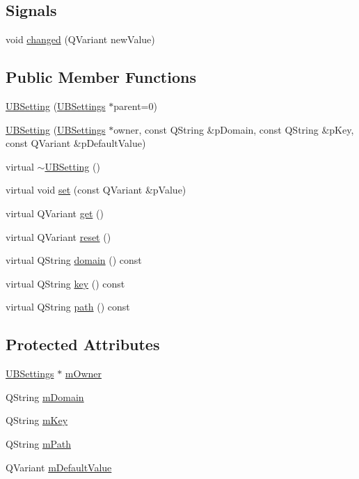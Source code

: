 \subsection*{Signals}
\begin{DoxyCompactItemize}
\item 
void \hyperlink{class_u_b_setting_a0f7d1e100a9d7d35a58c818a356702c7}{changed} (Q\-Variant new\-Value)
\end{DoxyCompactItemize}
\subsection*{Public Member Functions}
\begin{DoxyCompactItemize}
\item 
\hyperlink{class_u_b_setting_a4d219c5915a26e3575fc30c48d0f7bd1}{U\-B\-Setting} (\hyperlink{class_u_b_settings}{U\-B\-Settings} $\ast$parent=0)
\item 
\hyperlink{class_u_b_setting_a2c9ee4f1decfd6d14d4d3839ad9d58b3}{U\-B\-Setting} (\hyperlink{class_u_b_settings}{U\-B\-Settings} $\ast$owner, const Q\-String \&p\-Domain, const Q\-String \&p\-Key, const Q\-Variant \&p\-Default\-Value)
\item 
virtual \hyperlink{class_u_b_setting_af42b0a45a5dbe3b1bbf82a8176094fba}{$\sim$\-U\-B\-Setting} ()
\item 
virtual void \hyperlink{class_u_b_setting_a5dc12b91ffabb031a3a7a8322f5d30ed}{set} (const Q\-Variant \&p\-Value)
\item 
virtual Q\-Variant \hyperlink{class_u_b_setting_afe671b284dd9f1e313e6f27df3ecd2a8}{get} ()
\item 
virtual Q\-Variant \hyperlink{class_u_b_setting_a63ccc6724ba8befce05a946c3c5d3da9}{reset} ()
\item 
virtual Q\-String \hyperlink{class_u_b_setting_a03f4735df16c7ef73eb27447e5de50b7}{domain} () const 
\item 
virtual Q\-String \hyperlink{class_u_b_setting_a9e7d9c5c26a4a11dc8c34bbd21fb8955}{key} () const 
\item 
virtual Q\-String \hyperlink{class_u_b_setting_a7e6c2ccb08dd00f7b59e78f67112d086}{path} () const 
\end{DoxyCompactItemize}
\subsection*{Protected Attributes}
\begin{DoxyCompactItemize}
\item 
\hyperlink{class_u_b_settings}{U\-B\-Settings} $\ast$ \hyperlink{class_u_b_setting_a2b0c7c506e9fb69725a68e54781eff08}{m\-Owner}
\item 
Q\-String \hyperlink{class_u_b_setting_ab30419ac5f9361f4d65c6c998fdc33bd}{m\-Domain}
\item 
Q\-String \hyperlink{class_u_b_setting_a4e0199b4b8d6a065b899396b16f89ddd}{m\-Key}
\item 
Q\-String \hyperlink{class_u_b_setting_a0b6267dac1334d5478320fbff8eacd9f}{m\-Path}
\item 
Q\-Variant \hyperlink{class_u_b_setting_a932900881cb5c54769356ed68955e721}{m\-Default\-Value}
\end{DoxyCompactItemize}


